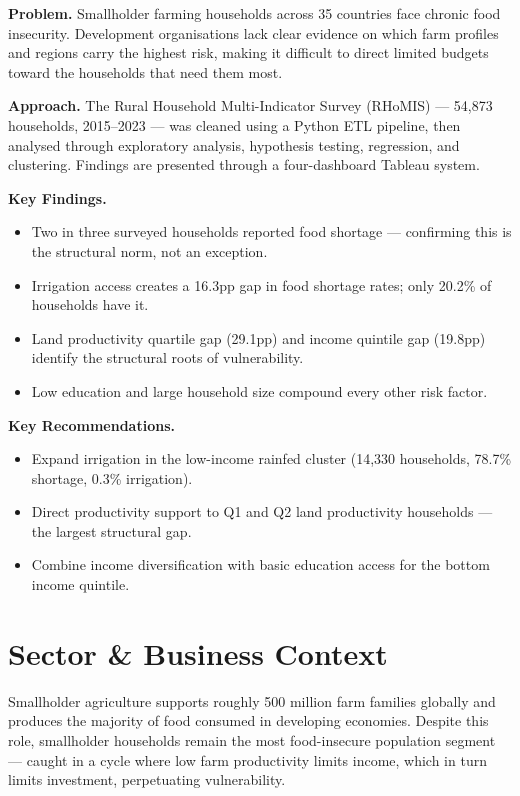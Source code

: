 \documentclass[11pt,a4paper]{article}
\begin{document}
\vspace{8pt}

\textbf{Problem.} Smallholder farming households across 35 countries face chronic food insecurity. Development organisations lack clear evidence on which farm profiles and regions carry the highest risk, making it difficult to direct limited budgets toward the households that need them most.

\textbf{Approach.} The Rural Household Multi-Indicator Survey (RHoMIS) — 54,873 households, 2015--2023 — was cleaned using a Python ETL pipeline, then analysed through exploratory analysis, hypothesis testing, regression, and clustering. Findings are presented through a four-dashboard Tableau system.

\textbf{Key Findings.}
\begin{itemize}
  \item Two in three surveyed households reported food shortage — confirming this is the structural norm, not an exception.
  \item Irrigation access creates a 16.3pp gap in food shortage rates; only 20.2\% of households have it.
  \item Land productivity quartile gap (29.1pp) and income quintile gap (19.8pp) identify the structural roots of vulnerability.
  \item Low education and large household size compound every other risk factor.
\end{itemize}

\textbf{Key Recommendations.}
\begin{itemize}
  \item Expand irrigation in the low-income rainfed cluster (14,330 households, 78.7\% shortage, 0.3\% irrigation).
  \item Direct productivity support to Q1 and Q2 land productivity households — the largest structural gap.
  \item Combine income diversification with basic education access for the bottom income quintile.
\end{itemize}

\newpage

\section{Sector \& Business Context}

Smallholder agriculture supports roughly 500 million farm families globally and produces the majority of food consumed in developing economies. Despite this role, smallholder households remain the most food-insecure population segment — caught in a cycle where low farm productivity limits income, which in turn limits investment, perpetuating vulnerability.
\end{document}
